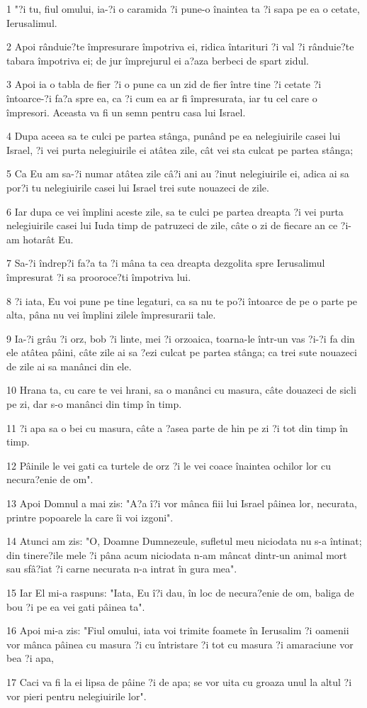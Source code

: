 \par 1 "?i tu, fiul omului, ia-?i o caramida ?i pune-o înaintea ta ?i sapa pe ea o cetate, Ierusalimul.
\par 2 Apoi rânduie?te împresurare împotriva ei, ridica întarituri ?i val ?i rânduie?te tabara împotriva ei; de jur împrejurul ei a?aza berbeci de spart zidul.
\par 3 Apoi ia o tabla de fier ?i o pune ca un zid de fier între tine ?i cetate ?i întoarce-?i fa?a spre ea, ca ?i cum ea ar fi împresurata, iar tu cel care o împresori. Aceasta va fi un semn pentru casa lui Israel.
\par 4 Dupa aceea sa te culci pe partea stânga, punând pe ea nelegiuirile casei lui Israel, ?i vei purta nelegiuirile ei atâtea zile, cât vei sta culcat pe partea stânga;
\par 5 Ca Eu am sa-?i numar atâtea zile câ?i ani au ?inut nelegiuirile ei, adica ai sa por?i tu nelegiuirile casei lui Israel trei sute nouazeci de zile.
\par 6 Iar dupa ce vei împlini aceste zile, sa te culci pe partea dreapta ?i vei purta nelegiuirile casei lui Iuda timp de patruzeci de zile, câte o zi de fiecare an ce ?i-am hotarât Eu.
\par 7 Sa-?i îndrep?i fa?a ta ?i mâna ta cea dreapta dezgolita spre Ierusalimul împresurat ?i sa prooroce?ti împotriva lui.
\par 8 ?i iata, Eu voi pune pe tine legaturi, ca sa nu te po?i întoarce de pe o parte pe alta, pâna nu vei împlini zilele împresurarii tale.
\par 9 Ia-?i grâu ?i orz, bob ?i linte, mei ?i orzoaica, toarna-le într-un vas ?i-?i fa din ele atâtea pâini, câte zile ai sa ?ezi culcat pe partea stânga; ca trei sute nouazeci de zile ai sa manânci din ele.
\par 10 Hrana ta, cu care te vei hrani, sa o manânci cu masura, câte douazeci de sicli pe zi, dar s-o manânci din timp în timp.
\par 11 ?i apa sa o bei cu masura, câte a ?asea parte de hin pe zi ?i tot din timp în timp.
\par 12 Pâinile le vei gati ca turtele de orz ?i le vei coace înaintea ochilor lor cu necura?enie de om".
\par 13 Apoi Domnul a mai zis: "A?a î?i vor mânca fiii lui Israel pâinea lor, necurata, printre popoarele la care îi voi izgoni".
\par 14 Atunci am zis: "O, Doamne Dumnezeule, sufletul meu niciodata nu s-a întinat; din tinere?ile mele ?i pâna acum niciodata n-am mâncat dintr-un animal mort sau sfâ?iat ?i carne necurata n-a intrat în gura mea".
\par 15 Iar El mi-a raspuns: "Iata, Eu î?i dau, în loc de necura?enie de om, baliga de bou ?i pe ea vei gati pâinea ta".
\par 16 Apoi mi-a zis: "Fiul omului, iata voi trimite foamete în Ierusalim ?i oamenii vor mânca pâinea cu masura ?i cu întristare ?i tot cu masura ?i amaraciune vor bea ?i apa,
\par 17 Caci va fi la ei lipsa de pâine ?i de apa; se vor uita cu groaza unul la altul ?i vor pieri pentru nelegiuirile lor".

